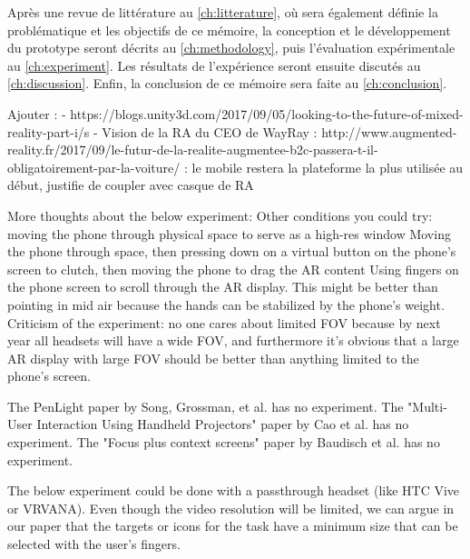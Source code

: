 
Après une revue de littérature au \autoref{ch:litterature}, où sera également définie la problématique et les objectifs de ce mémoire, la conception et le développement du prototype seront décrits au \autoref{ch:methodology}, puis l'évaluation expérimentale au \autoref{ch:experiment}. Les résultats de l'expérience seront ensuite discutés au \autoref{ch:discussion}. Enfin, la conclusion de ce mémoire sera faite au \autoref{ch:conclusion}.



Ajouter :
- https://blogs.unity3d.com/2017/09/05/looking-to-the-future-of-mixed-reality-part-i/s
- Vision de la RA du CEO de WayRay : http://www.augmented-reality.fr/2017/09/le-futur-de-la-realite-augmentee-b2c-passera-t-il-obligatoirement-par-la-voiture/ : le mobile restera la plateforme la plus utilisée au début, justifie de coupler avec casque de RA


More thoughts about the below experiment:
Other conditions you could try: moving the phone through physical space to serve as a high-res window
Moving the phone through space, then pressing down on a virtual button on the phone's screen to clutch, then moving the phone to drag the AR content
Using fingers on the phone screen to scroll through the AR display. This might be better than pointing in mid air because the hands can be stabilized by the phone's weight.
Criticism of the experiment: no one cares about limited FOV because by next year all headsets will have a wide FOV, and furthermore it's obvious that a large AR display with large FOV should be better than anything limited to the phone's screen.
 
The PenLight paper by Song, Grossman, et al. has no experiment.
The "Multi-User Interaction Using Handheld Projectors" paper by Cao et al. has no experiment.
The "Focus plus context screens" paper by Baudisch et al. has no experiment.
 
The below experiment could be done with a passthrough headset (like HTC Vive or VRVANA). Even though the video resolution will be limited, we can argue in our paper that the targets or icons for the task have a minimum size that can be selected with the user's fingers.
 
